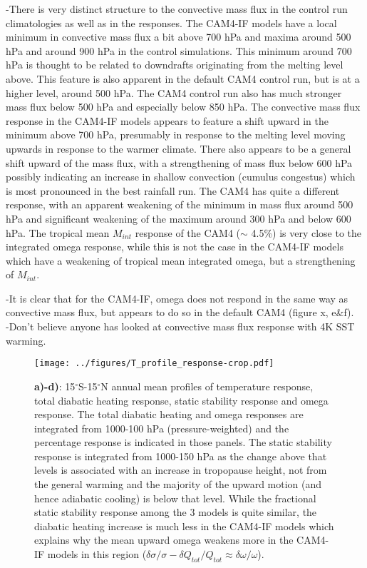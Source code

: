 \documentclass[letterpaper,12pt,titlepage,oneside,final]{book}
\begin{document}
-There is very distinct structure to the convective mass flux in the control run climatologies as well as in the responses. The CAM4-IF models have a local minimum in convective mass flux a bit above 700 hPa and maxima around 500 hPa and around 900 hPa in the control simulations. This minimum around 700 hPa is thought to be related to downdrafts originating from the melting level above. This feature is also apparent in the default CAM4 control run, but is at a higher level, around 500 hPa. The CAM4 control run also has much stronger mass flux below 500 hPa and especially below 850 hPa. The convective mass flux response in the CAM4-IF models appears to feature a shift upward in the minimum above 700 hPa, presumably in response to the melting level moving upwards in response to the warmer climate. There also appears to be a general shift upward of the mass flux, with a strengthening of mass flux below 600 hPa possibly indicating an increase in shallow convection (cumulus congestus) which is most pronounced in the best rainfall run. The CAM4 has quite a different response, with an apparent weakening of the minimum in mass flux around 500 hPa and significant weakening of the maximum around 300 hPa and below 600 hPa. The tropical mean $M_{int}$ response of the CAM4 ($\sim$ 4.5\%) is very close to the integrated omega response, while this is not the case in the CAM4-IF models which have a weakening of tropical mean integrated omega, but a strengthening of $M_{int}$.


-It is clear that for the CAM4-IF, omega does not respond in the same way as convective mass flux, but appears to do so in the default CAM4 (figure x, e\&f).
\\
-Don't believe anyone has looked at convective mass flux response with 4K SST warming.
\\


\begin{figure}[H]
\centering
\noindent\texttt{[image: ../figures/T\_profile\_response-crop.pdf]}\hfill
\caption{\textbf{a)-d)}: 15$^\circ$S-15$^\circ$N annual mean profiles of temperature response, total diabatic heating response, static stability response and omega response. The total diabatic heating and omega responses are integrated from 1000-100 hPa (pressure-weighted) and the percentage response is indicated in those panels. The static stability response is integrated from 1000-150 hPa as the change above that levels is associated with an increase in tropopause height, not from the general warming and the majority of the upward motion (and hence adiabatic cooling) is below that level. While the fractional static stability response among the 3 models is quite similar, the diabatic heating increase is much less in the CAM4-IF models which explains why the mean upward omega weakens more in the CAM4-IF models in this region ($\delta{\sigma}/\sigma - \delta{Q_{tot}}/Q_{tot} \approx \delta{\omega}/\omega$).}
\end{figure}
\end{document}

